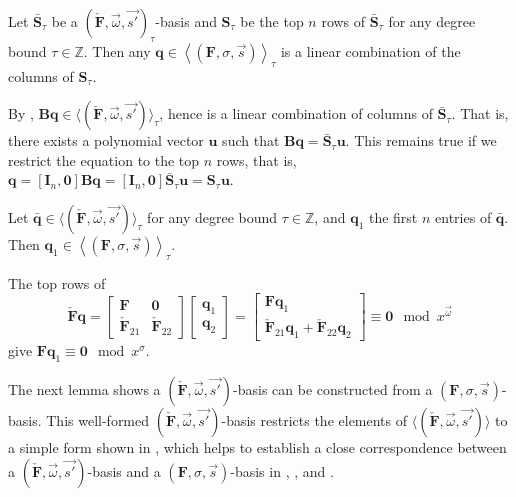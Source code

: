 \begin{cor}
\label{cor:linearCombinationOfFirstnRows}Let $\bar{\mathbf{S}}_{\tau}$
be a $(\check{\mathbf{F}},\vec{\omega},\vec{s'})_{\tau}$-basis and
$\mathbf{S}_{\tau}$ be the top $n$ rows of $\bar{\mathbf{S}}_{\tau}$
for any degree bound $\tau\in\mathbb{Z}$. Then any $\mathbf{q}\in\left\langle \left(\mathbf{F},\sigma,\vec{s}\right)\right\rangle _{\tau}$
is a linear combination of the columns of $\mathbf{S}_{\tau}$.\end{cor}
\begin{pf}
By , $\mathbf{B}\mathbf{q}\in\langle(\check{\mathbf{F}},\vec{\omega},\vec{s'})\rangle_{\tau}$,
hence is a linear combination of columns of $\bar{\mathbf{S}}_{\tau}$.
That is, there exists a polynomial vector $\mathbf{u}$ such that
$\mathbf{B}\mathbf{q}=\bar{\mathbf{S}}_{\tau}\mathbf{u}$. This remains
true if we restrict the equation to the top $n$ rows, that is, $\mathbf{q}=\left[\mathbf{I}_{n},\mathbf{0}\right]\mathbf{B}\mathbf{q}=\left[\mathbf{I}_{n},\mathbf{0}\right]\bar{\mathbf{S}}_{\tau}\mathbf{u}=\mathbf{S}_{\tau}\mathbf{u}$.\end{pf}
\begin{lem}
\label{lem:bqToqOrder}Let $\bar{\mathbf{q}}\in\langle(\check{\mathbf{F}},\vec{\omega},\vec{s'})\rangle_{\tau}$
for any degree bound $\tau\in\mathbb{Z}$, and $\mathbf{q}_{1}$ the
first $n$ entries of $\mathbf{\bar{q}}$. Then $\mathbf{q}_{1}\in\left\langle \left(\mathbf{F},\sigma,\vec{s}\right)\right\rangle _{\tau}$.\end{lem}
\begin{pf}
The top rows of \[
\check{\mathbf{F}}\mathbf{q}=\left[\begin{array}{cc}
\mathbf{F} & \mathbf{0}\\
\check{\mathbf{F}}_{21} & \check{\mathbf{F}}_{22}\end{array}\right]\left[\begin{array}{c}
\mathbf{q}_{1}\\
\mathbf{q}_{2}\end{array}\right]=\begin{bmatrix}\mathbf{F}\mathbf{q}_{1}\\
\check{\mathbf{F}}_{21}\mathbf{q}_{1}+\check{\mathbf{F}}_{22}\mathbf{q}_{2}\end{bmatrix}\equiv\mathbf{0}\mod x^{\vec{\omega}}\]
 give $\mathbf{F}\mathbf{q}_{1}\equiv\mathbf{0}\mod x^{\sigma}$.

The next lemma shows a $(\check{\mathbf{F}},\vec{\omega},\vec{s'})$-basis
can be constructed from a $\left(\mathbf{F},\sigma,\vec{s}\right)$-basis.
This well-formed $(\check{\mathbf{F}},\vec{\omega},\vec{s'})$-basis
restricts the elements of $\langle(\check{\mathbf{F}},\vec{\omega},\vec{s'})\rangle$
to a simple form shown in , which helps
to establish a close correspondence between a $(\check{\mathbf{F}},\vec{\omega},\vec{s'})$-basis
and a $\left(\mathbf{F},\sigma,\vec{s}\right)$-basis in ,
, and .\end{pf}
